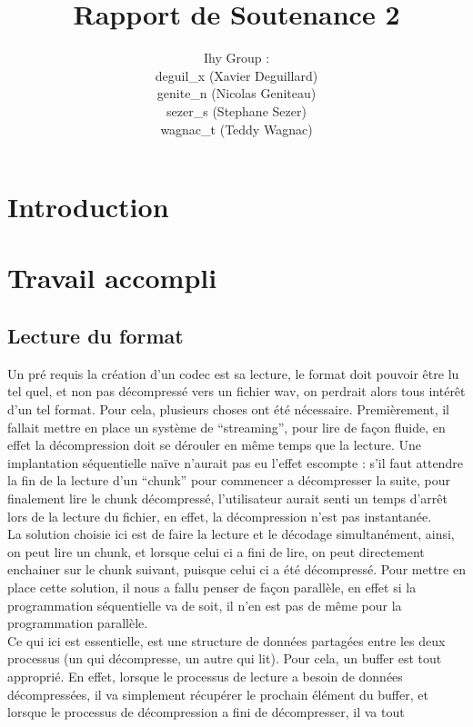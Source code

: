 \documentclass[a4paper,12pt]{article}
\title{Rapport de Soutenance 2}
\author{
Ihy Group : \\
deguil\_x (Xavier Deguillard)\\
genite\_n (Nicolas Geniteau)\\
sezer\_s (Stephane Sezer)\\
wagnac\_t (Teddy Wagnac)
}
\begin{document}
\maketitle

\newpage

\section*{Introduction}

\newpage

\tableofcontents

\newpage

\section{Travail accompli}
	\subsection{Lecture du format}
Un pré requis la création d'un codec est sa lecture, le format doit
pouvoir être lu tel quel, et non pas décompressé vers un fichier wav, on
perdrait alors tous intérêt d'un tel format. Pour cela, plusieurs choses
ont été nécessaire. Premièrement, il fallait mettre en place un système
de ``streaming'', pour lire de façon fluide, en effet la décompression
doit se dérouler en même temps que la lecture. Une implantation
séquentielle naïve n'aurait pas eu l'effet escompte : s'il faut attendre
la fin de la lecture d'un ``chunk'' pour commencer a décompresser la
suite, pour finalement lire le chunk décompressé, l'utilisateur aurait
senti un temps d'arrêt lors de la lecture du fichier, en effet, la
décompression n'est pas instantanée.\\
La solution choisie ici est de faire la lecture et le décodage simultanément,
ainsi, on peut lire un chunk, et lorsque celui ci a fini de lire, on peut
directement enchainer sur le chunk suivant, puisque celui ci a été décompressé.
Pour mettre en place cette solution, il nous a fallu penser de façon parallèle,
en effet si la programmation séquentielle va de soit, il n'en est pas de même
pour la programmation parallèle.\\
Ce qui ici est essentielle, est une structure de données partagées entre les
deux processus (un qui décompresse, un autre qui lit). Pour cela, un buffer est
tout approprié. En effet, lorsque le processus de lecture a besoin de données
décompressées, il va simplement récupérer le prochain élément du buffer, et
lorsque le processus de décompression a fini de décompresser, il va tout
\end{document}
